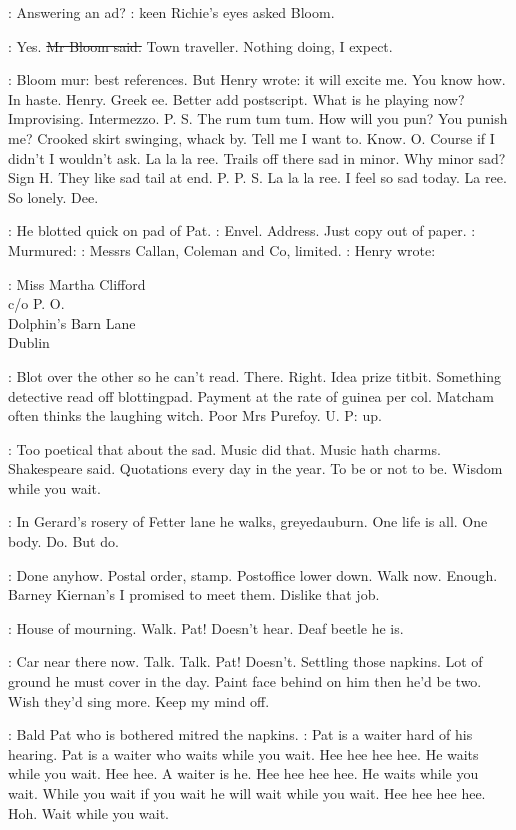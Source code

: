 \goulding:
Answering an ad?
:
keen Richie's eyes asked Bloom.

\Bloom:
Yes.
\sout{Mr Bloom said.}
Town traveller.
Nothing doing,
I expect.

\BloomInt:
Bloom mur:
best references.
But Henry wrote:
it will excite me.
You
know how.
In haste.
Henry.
Greek ee.
Better add postscript.
What is he
playing now?
Improvising.
Intermezzo.
P.
S.
The rum tum tum.
How will
you pun?
You punish me?
Crooked skirt swinging,
whack by.
Tell me I want
to.
Know.
O.
Course if I didn't I wouldn't ask.
La la la ree.
Trails off
there sad in minor.
Why minor sad?
Sign H.
They like sad tail at end.
P.
P.
S.
La la la ree.
I feel so sad today.
La ree.
So lonely.
Dee.

:
He blotted quick on pad of Pat.
\BloomInt:
Envel.
Address.
Just copy out of paper.
:
Murmured:
\BloomInt:
Messrs Callan,
Coleman and Co,
limited.
:
Henry wrote:

:
        Miss Martha Clifford\\
            c/o P.
O.\\
                Dolphin's Barn Lane\\
                     Dublin

\BloomInt:
Blot over the other so he can't read.
There.
Right.
Idea prize titbit.
Something detective read off blottingpad.
Payment at the rate of guinea
per col.
Matcham often thinks the laughing witch.
Poor Mrs Purefoy.
U.
P:
up.

\BloomInt:
Too poetical that about the sad.
Music did that.
Music hath charms.
Shakespeare said.
Quotations every day in the year.
To be or not to be.
Wisdom while you wait.

\BloomInt:
In Gerard's rosery of Fetter lane he walks,
greyedauburn.
One life is
all.
One body.
Do.
But do.

\BloomInt:
Done anyhow.
Postal order,
stamp.
Postoffice lower down.
Walk
now.
Enough.
Barney Kiernan's I promised to meet them.
Dislike that job.

\BloomInt:
House of mourning.
Walk.
Pat!
Doesn't hear.
Deaf beetle he is.

\BloomInt:
Car near there now.
Talk.
Talk.
Pat!
Doesn't.
Settling those napkins.
Lot of ground he must cover in the day.
Paint face behind on him then he'd
be two.
Wish they'd sing more.
Keep my mind off.

:
Bald Pat who is bothered mitred the napkins.
\BloomInt:
Pat is a waiter hard of
his hearing.
Pat is a waiter who waits while you wait.
Hee hee hee hee.
He
waits while you wait.
Hee hee.
A waiter is he.
Hee hee hee hee.
He waits
while you wait.
While you wait if you wait he will wait while you wait.
Hee hee hee hee.
Hoh.
Wait while you wait.

